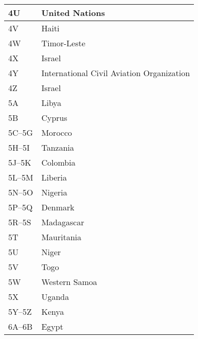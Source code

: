 \begin{longtable}{|l|l|}
  \hline
  4U                  & United Nations                            \\
  \hline
  4V                  & Haiti                                     \\
  \hline
  4W                  & Timor-Leste                               \\
  \hline
  4X                  & Israel                                    \\
  \hline
  4Y                  & International Civil Aviation Organization \\
  \hline
  4Z                  & Israel                                    \\
  \hline
  5A                  & Libya                                     \\
  \hline
  5B                  & Cyprus                                    \\
  \hline
  5C--5G              & Morocco                                   \\
  \hline
  5H--5I              & Tanzania                                  \\
  \hline
  5J--5K              & Colombia                                  \\
  \hline
  5L--5M              & Liberia                                   \\
  \hline
  5N--5O              & Nigeria                                   \\
  \hline
  5P--5Q              & Denmark                                   \\
  \hline
  5R--5S              & Madagascar                                \\
  \hline
  5T                  & Mauritania                                \\
  \hline
  5U                  & Niger                                     \\
  \hline
  5V                  & Togo                                      \\
  \hline
  5W                  & Western Samoa                             \\
  \hline
  5X                  & Uganda                                    \\
  \hline
  5Y--5Z              & Kenya                                     \\
  \hline
  6A--6B              & Egypt                                     \\
  \hline

\end{longtable}
